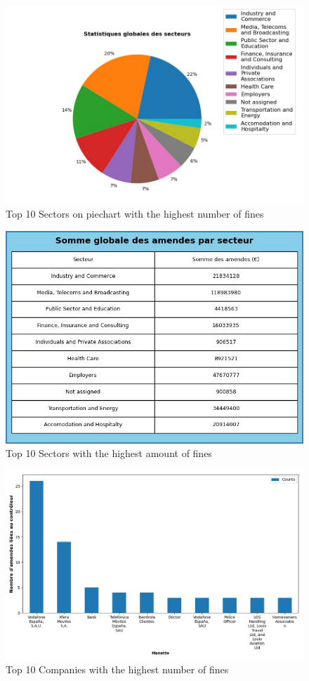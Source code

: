 \documentclass[12pt]{article}
\begin{document}
\newpage

	\begin{multicols}{2}
	\begin{figure}
		[H]\centering\includegraphics[width=1.0\linewidth]{graphs/sector_data}
		\caption{Top 10 Sectors on piechart with the highest number of fines}
	\end{figure}
	\begin{figure}
		[H]\centering\includegraphics[width=1\linewidth]{graphs/sector_data_fines}
		\caption{Top 10 Sectors with the highest amount of fines}
	 \end{figure}
	
	\end{multicols}
	
	
	
	\begin{figure}
		[H]\centering\includegraphics[width=0.6\linewidth]{graphs/top10_controller}
		\caption{Top 10 Companies with the highest number of fines}
	\end{figure}
	
\end{document}
